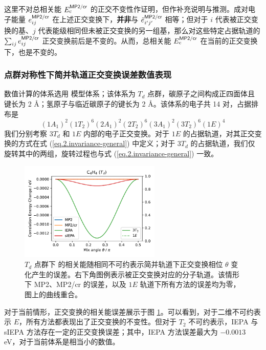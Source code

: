 这里不对总相关能 $E_\mathrm{c}^{\textsf{MP2/cr}}$ 的正交不变性作证明，但作补充说明与推测。成对电子能量 $e_{ij}^{\textsf{MP2/cr}}$ 在上述正交变换下，\textbf{并非}与 $\tilde{e}_{i'j'}^{\textsf{MP2/cr}}$ 相等；但对于 $i$ 代表被正交变换的基、$j$ 代表能级相同但未被正交变换的另一组基，那么对这些特定占据轨道的 $\sum_{ij} e_{ij}^{\textsf{MP2/cr}}$ 正交变换前后是不变的。从而，总相关能 $E_\mathrm{c}^{\textsf{MP2/cr}}$ 在当前的正交变换下，也是不变的。

\subsubsection{点群对称性下简并轨道正交变换误差数值表现}

数值计算的体系选用  模型体系；该体系为 $T_d$ 点群，碳原子之间构成正四面体且键长为 2 \AA；氢原子与临近碳原子的键长为 2 \AA。该体系的电子共 14 对，占据排布是
$$
(1 A_1)^2 (1 T_2)^6 (2 A_1)^2 (2 T_2)^6 (3 A_1)^2 (3 T_2)^6 (1 E)^4
$$
我们分别考察 $3 T_d$ 和 $1 E$ 内部的电子正交变换。对于 $1E$ 的占据轨道，对其正交变换的方式在式 (\ref{eq.2.invariance-general}) 中定义；对于 $3 T_d$ 的占据轨道，我们仅旋转其中的两组，旋转过程也与式 (\ref{eq.2.invariance-general}) 一致。

\begin{figure}[!ht]
  \centering
  \includegraphics[width=0.6\textwidth]{assets/invar-sep-C4H4-1.pdf}
  \caption[$T_d$ 点群下  对称性简并轨道正交变换误差]{$T_d$ 点群下  的相关能随相同不可约表示简并轨道下正交变换相位 $\theta$ 变化产生的误差。右下角图例表示被正交变换对应的分子轨道。该情形下 MP2、MP2/cr 的误差，以及 $1E$ 轨道下所有方法的误差均为零，图上的曲线重合。}
  \label{fig.2.invar-sep-C4H4-1}
\end{figure}

对于当前情形，正交变换的相关能误差展示于图 \ref{fig.2.invar-sep-C4H4-1}。可以看到，对于二维不可约表示 $E$，所有方法都表现出了正交变换的不变性。但对于 $T_2$ 不可约表示，IEPA 与 sIEPA 方法存在一定的正交变换误差；其中，IEPA 方法误差最大为 $-0.0013$ eV，对于当前体系是相当小的数值。

